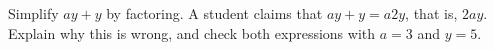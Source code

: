 Simplify $ay+y$ by factoring. A student claims that $ay+y=a2y$, that is, $2ay$. Explain why this is wrong, and check both expressions with $a=3$ and $y=5$.
